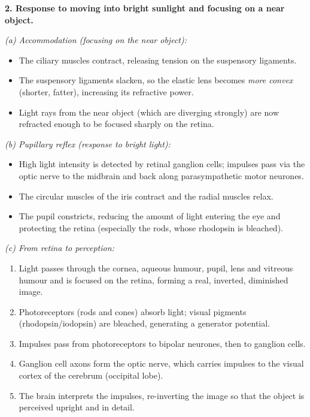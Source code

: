 \documentclass[11pt]{article}
\newcommand{\cle}[1]{{\popxbold\color{popdark}#1}}
\begin{document}
\begin{corrige}
\textbf{2. Response to moving into bright sunlight and focusing on a near object.}\par
\emph{(a) Accommodation (focusing on the near object):}
\begin{itemize}
\item The \cle{ciliary muscles contract}, releasing tension on the suspensory ligaments.
\item The \cle{suspensory ligaments slacken}, so the elastic \cle{lens} becomes \emph{more convex} (shorter, fatter), increasing its refractive power.
\item Light rays from the near object (which are diverging strongly) are now refracted enough to be focused sharply on the retina.
\end{itemize}
\emph{(b) Pupillary reflex (response to bright light):}
\begin{itemize}
\item High light intensity is detected by retinal ganglion cells; impulses pass via the optic nerve to the midbrain and back along parasympathetic motor neurones.
\item The \cle{circular muscles of the iris contract} and the radial muscles relax.
\item The \cle{pupil constricts}, reducing the amount of light entering the eye and protecting the retina (especially the rods, whose rhodopsin is bleached).
\end{itemize}
\emph{(c) From retina to perception:}
\begin{enumerate}
\item Light passes through the cornea, aqueous humour, pupil, lens and vitreous humour and is focused on the retina, forming a real, inverted, diminished image.
\item Photoreceptors (rods and cones) absorb light; visual pigments (rhodopsin/iodopsin) are bleached, generating a generator potential.
\item Impulses pass from photoreceptors to bipolar neurones, then to ganglion cells.
\item Ganglion cell axons form the optic nerve, which carries impulses to the visual cortex of the cerebrum (occipital lobe).
\item The brain interprets the impulses, re-inverting the image so that the object is perceived upright and in detail.
\end{enumerate}
\end{corrige}
\end{document}
